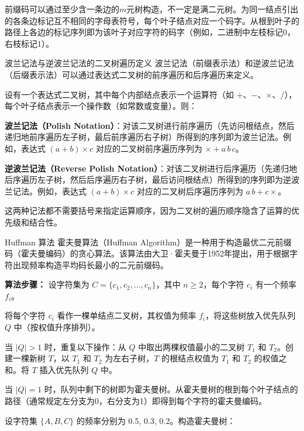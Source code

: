 \documentclass[lang=cn,11pt]{elegantbook}
\begin{document}
前缀码可以通过至少含一条边的$m$元树构造，不一定是满二元树。为同一结点引出的各条边标记互不相同的字母表符号，每个叶子结点对应一个码字。从根到叶子的路径上各边的标记序列即为该叶子对应字符的码字（例如，二进制中左枝标记0，右枝标记1）。
\begin{definition}{波兰记法与逆波兰记法的二叉树遍历定义}
波兰记法（前缀表示法）和逆波兰记法（后缀表示法）可以通过表达式二叉树的前序遍历和后序遍历来定义。

设有一个表达式二叉树，其中每个内部结点表示一个运算符（如 $+$、$-$、$\times$、$/$），每个叶子结点表示一个操作数（如常数或变量）。则：

\textbf{波兰记法（Polish Notation）}：对该二叉树进行前序遍历（先访问根结点，然后递归地前序遍历左子树，最后前序遍历右子树）所得到的序列即为波兰记法。例如，表达式 $(a + b) \times c$ 对应的二叉树前序遍历序列为 $\times + a\, b\, c$。

\textbf{逆波兰记法（Reverse Polish Notation）}：对该二叉树进行后序遍历（先递归地后序遍历左子树，然后后序遍历右子树，最后访问根结点）所得到的序列即为逆波兰记法。例如，表达式 $(a + b) \times c$ 对应的二叉树后序遍历序列为 $a\, b + c \times$。

这两种记法都不需要括号来指定运算顺序，因为二叉树的遍历顺序隐含了运算的优先级和结合性。
\end{definition}
\begin{definition}{Huffman 算法}
霍夫曼算法（Huffman Algorithm）是一种用于构造最优二元前缀码（霍夫曼编码）的贪心算法。该算法由大卫·霍夫曼于1952年提出，用于根据字符出现频率构造平均码长最小的二元前缀码。

\textbf{算法步骤：}
设字符集为 $C=\{c_1,c_2,\dots,c_n\}$，其中 $n\geqslant 2$，每个字符 $c_i$ 有一个频率 $f_i$。

将每个字符 $c_i$ 看作一棵单结点二叉树，其权值为频率 $f_i$，将这些树放入优先队列 $Q$ 中（按权值升序排列）。

当 $|Q| > 1$ 时，重复以下操作：从 $Q$ 中取出两棵权值最小的二叉树 $T_1$ 和 $T_2$。创建一棵新树 $T$，以 $T_1$ 和 $T_2$ 为左右子树，$T$ 的根结点权值为 $T_1$ 和 $T_2$ 的权值之和。将 $T$ 插入优先队列 $Q$ 中。

当 $|Q| = 1$ 时，队列中剩下的树即为霍夫曼树。从霍夫曼树的根到每个叶子结点的路径（通常规定左分支为0，右分支为1）即得到每个字符的霍夫曼编码。
\end{definition}
设字符集 $\{A,B,C\}$ 的频率分别为 0.5, 0.3, 0.2。构造霍夫曼树：
\end{document}
